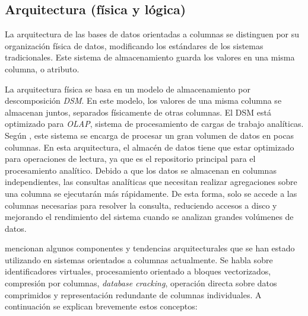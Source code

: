 \subsection{Arquitectura (física y lógica)}
La arquitectura de las bases de datos orientadas a columnas se distinguen por su organización física de datos, modificando los estándares de los sistemas tradicionales. Este sistema de almacenamiento guarda los valores en una misma columna, o atributo. 

La arquitectura física se basa en un modelo de almacenamiento por descomposición \textit{DSM}. En este modelo, los valores de una misma columna se almacenan juntos, separados físicamente de otras columnas. El DSM está optimizado para \textit{OLAP}, sistema de procesamiento de cargas de trabajo analíticas. Según \textcite{matei2010}, este sistema se encarga de procesar un gran volumen de datos en pocas columnas. En esta arquitectura, el almacén de datos tiene que estar optimizado para operaciones de lectura, ya que es el repositorio principal para el procesamiento analítico. Debido a que los datos se almacenan en columnas independientes, las consultas analíticas que necesitan realizar agregaciones sobre una columna se ejecutarán más rápidamente. De esta forma, solo se accede a las columnas necesarias para resolver la consulta, reduciendo accesos a disco y mejorando el rendimiento del sistema cuando se analizan grandes volúmenes de datos.

\textcite{abadi2013} mencionan algunos componentes y tendencias arquitecturales que se han estado utilizando en sistemas orientados a columnas actualmente. Se habla sobre identificadores virtuales, procesamiento orientado a bloques vectorizados, compresión por columnas, \textit{database cracking}, operación directa sobre datos comprimidos y representación redundante de columnas individuales. A continuación se explican brevemente estos conceptos:

